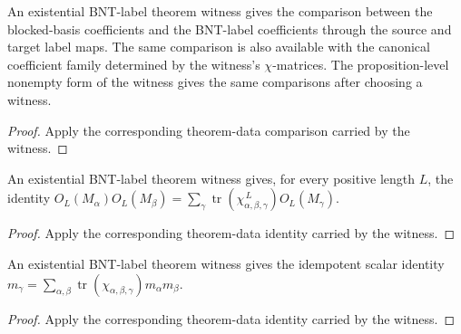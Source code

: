 \begin{theorem}%
    \label{thm:mpdo_bnt_label_theorem_witness_blocked_coeff_eq}
    \leanok
    An existential BNT-label theorem witness gives the comparison between the
    blocked-basis coefficients and the BNT-label coefficients through the
    source and target label maps. The same comparison is also available with
    the canonical coefficient family determined by the witness's
    $\chi$-matrices. The proposition-level nonempty form of the witness
    gives the same comparisons after choosing a witness.
\end{theorem}
\begin{proof}\leanok
    Apply the corresponding theorem-data comparison carried by the witness.
\end{proof}

\begin{theorem}%
    \label{thm:mpdo_bnt_label_theorem_witness_same_length_product_eq_sum_chi_trace_pow}
    \leanok
    An existential BNT-label theorem witness gives, for every positive length
    $L$, the identity
    $O_L(M_\alpha)O_L(M_\beta)
        = \sum_\gamma
        \operatorname{tr}(\chi_{\alpha,\beta,\gamma}^{\,L}) O_L(M_\gamma)$.
\end{theorem}
\begin{proof}\leanok
    Apply the corresponding theorem-data identity carried by the witness.
\end{proof}

\begin{theorem}%
    \label{thm:mpdo_bnt_label_theorem_witness_idempotent_eq_sum_chi_trace}
    \leanok
    An existential BNT-label theorem witness gives the idempotent scalar
    identity
    $m_\gamma =
        \sum_{\alpha,\beta}
        \operatorname{tr}(\chi_{\alpha,\beta,\gamma})m_\alpha m_\beta$.
\end{theorem}
\begin{proof}\leanok
    Apply the corresponding theorem-data identity carried by the witness.
\end{proof}

